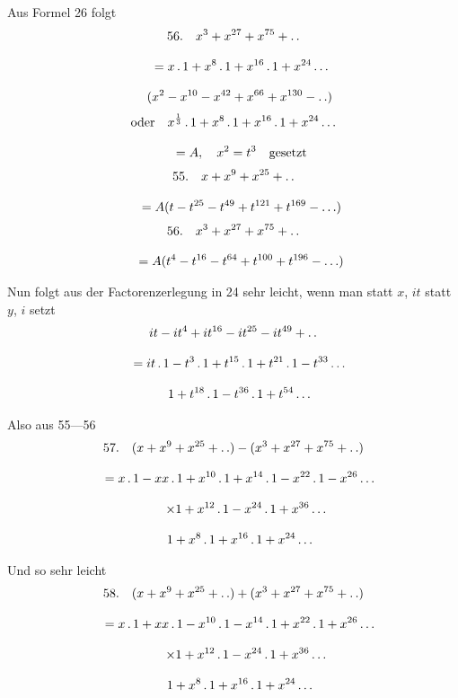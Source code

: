 Aus Formel 26 folgt
\[
\begin{gathered}56.\quad{}
x^3+x^{27}+x^{75}+ .\,. \\[8pt]\quad{}=x\,.\,1+x^8\,.\,1+x^{16}\,.\,1+x^{24}\mathinner{.\,.\,.}\\[8pt]\quad{}(x^2-x^{10}-x^{42}+x^{66}+x^{130}- .\,. )\end{gathered}
\]
\[
\begin{gathered}\text{oder}\quad x^{\frac13}\,.\,1+x^8\,.\,1+x^{16}\,.\,1+x^{24}\mathinner{.\,.\,.}\\[8pt]\quad{}=A,\quad x^2=t^3\quad\text{gesetzt}\end{gathered}
\]
\[
\begin{gathered}55.\quad{}
x+x^9+x^{25}+ .\,. \\[8pt]\quad{}=A(t-t^{25}-t^{49}+t^{121}+t^{169}-\mathinner{.\,.\,.})\end{gathered}
\]
\[
\begin{gathered}56.\quad{}
x^3+x^{27}+x^{75}+ .\,. \\[8pt]\quad{}=A(t^4-t^{16}-t^{64}+t^{100}+t^{196}-\mathinner{.\,.\,.})\end{gathered}
\]

Nun folgt aus der Factorenzerlegung in 24 sehr leicht, wenn man statt \(x\), \(it\)
statt \(y\), \(i\) setzt
\[
\begin{gathered}
it-it^4+it^{16}-it^{25}-it^{49}+ .\,.\\[8pt]
\quad=it\,.\,1-t^3\,.\,1+t^{15}\,.\,1+t^{21}\,.\,1-t^{33}\mathinner{.\,.\,.}\\[8pt]\quad{}1+t^{18}\,.\,1-t^{36}\,.\,1+t^{54}\mathinner{.\,.\,.}
\end{gathered}
\]

Also aus 55---56
\[
\begin{gathered}
57.\quad{}
(x+x^9+x^{25}+ .\,. )-(x^3+x^{27}+x^{75}+ .\,. )\\[8pt]
\quad=x\,.\,1-xx\,.\,1+x^{10}\,.\,1+x^{14}\,.\,1-x^{22}\,.\,1-x^{26}\mathinner{.\,.\,.}\\[8pt]
\qquad\times1+x^{12}\,.\,1-x^{24}\,.\,1+x^{36}\mathinner{.\,.\,.}\\[8pt]\quad{}1+x^8\,.\,1+x^{16}\,.\,1+x^{24}\mathinner{.\,.\,.}
\end{gathered}
\]

Und so sehr leicht
\[
\begin{gathered}
58.\quad{}
(x+x^9+x^{25}+ .\,. )+(x^3+x^{27}+x^{75}+ .\,. )\\[8pt]
\quad=x\,.\,1+xx\,.\,1-x^{10}\,.\,1-x^{14}\,.\,1+x^{22}\,.\,1+x^{26}\mathinner{.\,.\,.}\\[8pt]
\qquad\times1+x^{12}\,.\,1-x^{24}\,.\,1+x^{36}\mathinner{.\,.\,.}\\[8pt]\quad{}1+x^8\,.\,1+x^{16}\,.\,1+x^{24}\mathinner{.\,.\,.}
\end{gathered}
\]

